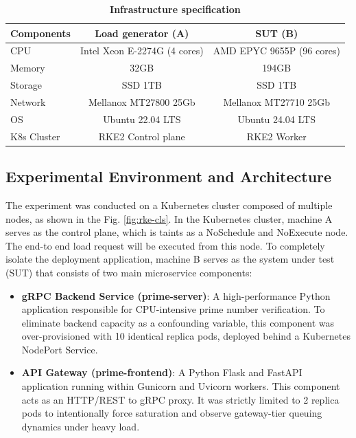 \documentclass{ieeeaccess}
\begin{document}
	
	\begin{table}[htbp]
		\centering
		\caption{\textbf{Infrastructure specification}}
		\label{tab:infra}
		\setlength{\tabcolsep}{3pt}
		\begin{tabular}{lcc}
			\hline
			\textbf{Components}& \textbf{Load generator (A)}& \textbf{SUT (B)}\\
			\hline
			CPU & Intel Xeon E-2274G (4 cores)& AMD EPYC 9655P (96 cores)\\
			Memory & 32GB & 194GB\\
			Storage & SSD 1TB & SSD 1TB\\
			Network & Mellanox MT27800 25Gb & Mellanox MT27710 25Gb\\
			OS & Ubuntu 22.04 LTS & Ubuntu 24.04 LTS\\
			K8s Cluster & RKE2 Control plane & RKE2 Worker  \\ 
			\hline
		\end{tabular}
	\end{table}
	
	
	\subsection{Experimental Environment and Architecture}
	\label{sec4.1}
	
	The experiment was conducted on a Kubernetes cluster composed of multiple nodes, as shown in the Fig. \ref{fig:rke-cls}. In the Kubernetes cluster, machine A serves as the control plane, which is taints as a NoSchedule and NoExecute node. The end-to end load request will be executed from this node. To completely isolate the deployment application, machine B serves as the system under test (SUT) that consists of two main microservice components:
	
	\begin{itemize}
		\item \textbf{gRPC Backend Service (prime-server)}: A high-performance Python application responsible for CPU-intensive prime number verification. To eliminate backend capacity as a confounding variable, this component was over-provisioned with 10 identical replica pods, deployed behind a Kubernetes NodePort Service.
		
		\item \textbf{API Gateway (prime-frontend)}: A Python Flask and FastAPI application running within Gunicorn and Uvicorn workers. This component acts as an HTTP/REST to gRPC proxy. It was strictly limited to 2 replica pods to intentionally force saturation and observe gateway-tier queuing dynamics under heavy load. 
	\end{itemize}
	
\end{document}
